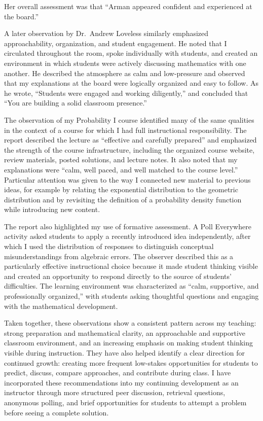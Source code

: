 \documentclass[11pt]{article}
\begin{document}
Her overall assessment was that
``Arman appeared confident and experienced at the board.''

A later observation by Dr.\ Andrew Loveless similarly emphasized
approachability,
organization,
and student engagement.
He noted that I circulated throughout the room,
spoke individually with students,
and created an environment in which students were actively discussing
mathematics with one another.
He described the atmosphere as calm and low-pressure
and observed that my explanations at the board were logically organized
and easy to follow.
As he wrote,
``Students were engaged and working diligently,''
and concluded that
``You are building a solid classroom presence.''

The observation of my Probability I course identified many of the same
qualities in the context of a course for which I had full instructional
responsibility.
The report described the lecture as
``effective and carefully prepared''
and emphasized the strength of the course infrastructure,
including the organized course website,
review materials,
posted solutions,
and lecture notes.
It also noted that my explanations were
``calm, well paced, and well matched to the course level.''
Particular attention was given to the way I connected new material to
previous ideas,
for example by relating the exponential distribution to the geometric
distribution and by revisiting the definition of a probability density
function while introducing new content.

The report also highlighted my use of formative assessment.
A Poll Everywhere activity asked students to apply a recently introduced
idea independently,
after which I used the distribution of responses to distinguish
conceptual misunderstandings from algebraic errors.
The observer described this as a particularly effective instructional
choice because it made student thinking visible and created an opportunity
to respond directly to the source of students' difficulties.
The learning environment was characterized as
``calm, supportive, and professionally organized,''
with students asking thoughtful questions and engaging with the
mathematical development.

Taken together,
these observations show a consistent pattern across my teaching:
strong preparation and mathematical clarity,
an approachable and supportive classroom environment,
and an increasing emphasis on making student thinking visible during
instruction.
They have also helped identify a clear direction for continued growth:
creating more frequent low-stakes opportunities for students to predict,
discuss,
compare approaches,
and contribute during class.
I have incorporated these recommendations into my continuing development
as an instructor through more structured peer discussion,
retrieval questions,
anonymous polling,
and brief opportunities for students to attempt a problem before seeing
a complete solution.
\end{document}
